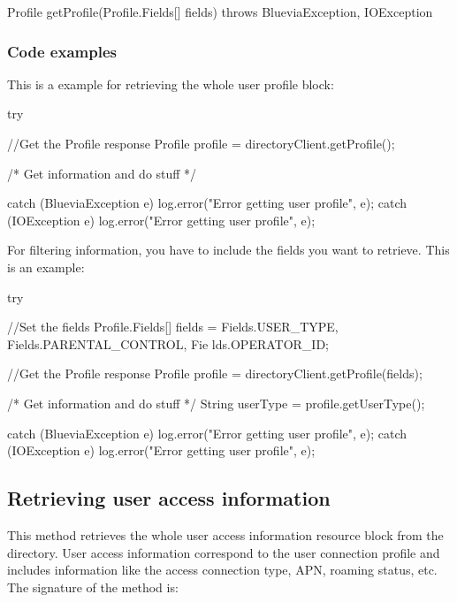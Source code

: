 \begin{DoxyCode}
Profile getProfile(Profile.Fields[] fields) throws BlueviaException, IOException
\end{DoxyCode}
\hypertarget{blv_directory_guide_user_profile_code_example_sec}{}\subsubsection{Code examples}\label{blv_directory_guide_user_profile_code_example_sec}
This is a example for retrieving the whole user profile block:


\begin{DoxyCode}
try {
        //Get the Profile response
        Profile profile = directoryClient.getProfile();

        /* Get information and do stuff */
          
} catch (BlueviaException e) {
        log.error("Error getting user profile", e);
} catch (IOException e) {
        log.error("Error getting user profile", e);
}
\end{DoxyCode}


For filtering information, you have to include the fields you want to retrieve. This is an example:


\begin{DoxyCode}
try {
        //Set the fields
        Profile.Fields[] fields = {Fields.USER_TYPE, Fields.PARENTAL_CONTROL, Fie
      lds.OPERATOR_ID};
        
        //Get the Profile response
        Profile profile = directoryClient.getProfile(fields);

        /* Get information and do stuff */
        String userType = profile.getUserType();
          
} catch (BlueviaException e) {
        log.error("Error getting user profile", e);
} catch (IOException e) {
        log.error("Error getting user profile", e);
}
\end{DoxyCode}
\hypertarget{blv_directory_guide_retrieving_user_access_info_sec}{}\subsection{Retrieving user access information}\label{blv_directory_guide_retrieving_user_access_info_sec}
This method retrieves the whole user access information resource block from the directory. User access information correspond to the user connection profile and includes information like the access connection type, APN, roaming status, etc. The signature of the method is:


